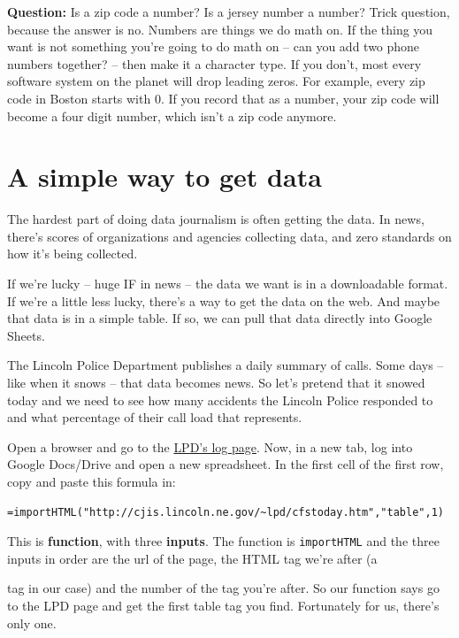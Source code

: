 \documentclass[]{book}
\begin{document}
\textbf{Question:} Is a zip code a number? Is a jersey number a number? Trick question, because the answer is no. Numbers are things we do math on. If the thing you want is not something you're going to do math on -- can you add two phone numbers together? -- then make it a character type. If you don't, most every software system on the planet will drop leading zeros. For example, every zip code in Boston starts with 0. If you record that as a number, your zip code will become a four digit number, which isn't a zip code anymore.

\hypertarget{a-simple-way-to-get-data}{%
\section{A simple way to get data}\label{a-simple-way-to-get-data}}

The hardest part of doing data journalism is often getting the data. In news, there's scores of organizations and agencies collecting data, and zero standards on how it's being collected.

If we're lucky -- huge IF in news -- the data we want is in a downloadable format. If we're a little less lucky, there's a way to get the data on the web. And maybe that data is in a simple table. If so, we can pull that data directly into Google Sheets.

The Lincoln Police Department publishes a daily summary of calls. Some days -- like when it snows -- that data becomes news. So let's pretend that it snowed today and we need to see how many accidents the Lincoln Police responded to and what percentage of their call load that represents.

Open a browser and go to the \href{http://cjis.lincoln.ne.gov/~lpd/cfstoday.htm}{LPD's log page}. Now, in a new tab, log into Google Docs/Drive and open a new spreadsheet. In the first cell of the first row, copy and paste this formula in:

\begin{verbatim}
=importHTML("http://cjis.lincoln.ne.gov/~lpd/cfstoday.htm","table",1)
\end{verbatim}

This is \textbf{function}, with three \textbf{inputs}. The function is \texttt{importHTML} and the three inputs in order are the url of the page, the HTML tag we're after (a

tag in our case) and the number of the tag you're after. So our function says go to the LPD page and get the first table tag you find. Fortunately for us, there's only one.
\end{document}
